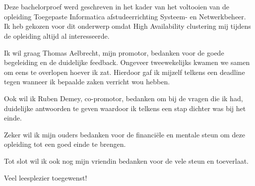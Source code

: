 
\chapter*{}
\label{ch:voorwoord}

Deze bachelorproef werd geschreven in het kader van het voltooien van de opleiding Toegepaste Informatica afstudeerrichting Systeem- en Netwerkbeheer. Ik heb gekozen voor dit onderwerp omdat High Availability clustering mij tijdens de opleiding altijd al interesseerde.

Ik wil graag Thomas Aelbrecht, mijn promotor, bedanken voor de goede begeleiding en de duidelijke feedback. Ongeveer tweewekelijks kwamen we samen om eens te overlopen hoever ik zat. Hierdoor gaf ik mijzelf telkens een deadline tegen wanneer ik bepaalde zaken verricht wou hebben.

Ook wil ik Ruben Demey, co-promotor, bedanken om bij de vragen die ik had, duidelijke antwoorden te geven waardoor ik telkens een stap dichter was bij het einde.

Zeker wil ik mijn ouders bedanken voor de financiële en mentale steun om deze opleiding tot een goed einde te brengen.

Tot slot wil ik ook nog mijn vriendin bedanken voor de vele steun en toeverlaat.

Veel leesplezier toegewenst!